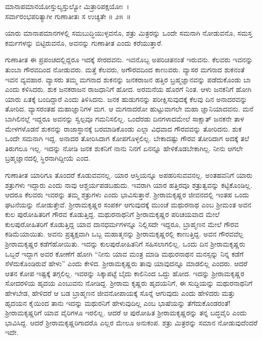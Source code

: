 \begin{shloka}
ಮಾನಾಪಮಾನಯೋಸ್ತುಲ್ಯಸ್ತುಲ್ಯೋ ಮಿತ್ರಾರಿಪಕ್ಷಯೋಃ~।\\ಸರ್ವಾರಂಭಪರಿತ್ಯಾಗೀ ಗುಣಾತೀತಃ ಸ ಉಚ್ಯತೇ \hfill॥ ೨೫~॥
\end{shloka}

\begin{artha}
ಯಾರು ಮಾನಾಪಮಾನಗಳಲ್ಲಿ ಸಮಬುದ್ಧಿಯುಳ್ಳವನೊ, ಶತ್ರು ಮಿತ್ರರನ್ನು ಒಂದೇ ಸಮನಾಗಿ ನೋಡುವನೊ, ಸಮಸ್ತ ಕರ್ಮಗಳನ್ನು ಬಿಟ್ಟಿರುವನೊ, ಅವನನ್ನು ಗುಣಾತೀತ ಎಂದು ಕರೆಯುತ್ತಾರೆ.
\end{artha}

ಗುಣಾತೀತ ಈ ಪ್ರಪಂಚದಲ್ಲಿದ್ದರೂ ಇದಕ್ಕೆ ಸೇರದವನು. ಇವನೊಬ್ಬ ಅಪರಿಚಿತನಂತೆ ಇರುವನು. ಕೆಲವರು ಇವನನ್ನು ತುಂಬಾ ಗೌರವದಿಂದ ನೋಡುವರು. ಮತ್ತೆ ಕೆಲವರು, ಅಗೌರವದಿಂದ ಕಾಣುವರು. ವ್ಯಾಸರ ಮಗನಾದ ಶುಕನಂತೆ ಇವನ ವ್ಯವಹಾರ. ವ್ಯಾಸರು ತಮ್ಮ ಮಗನಾದ ಶುಕನನ್ನು ಜನಕರಾಜನ ಹತ್ತಿರ ಬ್ರಹ್ಮಜ್ಞಾನವನ್ನು ಪಡೆದುಕೊಂಡು ಬಾ ಎಂದು ಕಳಿಸಿದರು. ಶುಕ ಜನಕರಾಜನ ರಾಜಧಾನಿಗೆ ಹೋದ. ಅರಮನೆಯ ಹೊರಗೆ ನಿಂತ. ಆಳು ಜನಕನಿಗೆ ಹೋಗಿ ಯಾರು ಏತಕ್ಕೆ ಬಂದಿದ್ದಾರೆ ಎಂದು ತಿಳಿಸಿದನು. ಜನಕ ಹುಡುಗನನ್ನು ಪರೀಕ್ಷಿಸುವುದಕ್ಕೆ ಕೆಲವು ದಿನ ಅನಾದರವನ್ನು ತೋರಿದ. ವ್ಯಾಸರಂತಹ ಮಹಾಜ್ಞಾನಿಗಳ ಮಗ. ಆ ಮಗನಾದರೋ ಹುಟ್ಟುವಾಗಲೇ ಮಹಾ ಜ್ಞಾನಿಯಾದವನು. ಮನೆ ಬಾಗಿಲಿನಲ್ಲೆ ಇದ್ದರೂ ಅವನನ್ನು ಸ್ವಲ್ಪವೂ ಗಮನಿಸಲಿಲ್ಲ. ಒಂದೆರಡು ದಿನಗಳಾದಮೇಲೆ ಸಾಕ್ಷಾತ್ ಜನಕನೇ ತಾಳ ಮೇಳಗಳೊಡನೆ ಶುಕನನ್ನು ರಾಜಾಸ್ಥಾನಕ್ಕೆ ಬರಮಾಡಿಕೊಂಡು ಎಲ್ಲಾ ವಿಧವಾದ ಗೌರವವನ್ನು ತೋರಿದನು. ಶುಕ ಒಂದೇ ಸಮನಾಗಿ ಇದ್ದ. ಅನಾದರ ತೋರಿಸಿದಾಗ ಕೋಪಗೊಳ್ಳಲಿಲ್ಲ. ಬೇಕಾದಷ್ಟು ಗೌರವ ತೋರಿದಾಗ ಅದಕ್ಕೆ ತಲೆ ತಿರುಗಲೂ ಇಲ್ಲ. ಇದನ್ನು ನೋಡಿ ಜನಕ ಶುಕನಿಗೆ ನಾನು ನಿನಗೆ ಏನನ್ನೂ ಹೇಳಿಕೊಡಬೇಕಾಗಿಲ್ಲ. ನೀನು ಆಗಲೇ ಬ್ರಹ್ಮಜ್ಞಾನದಲ್ಲಿ ಸ್ಥಿರನಾಗಿದ್ದೀಯೆ ಎಂದ.

ಗುಣಾತೀತ ಯಾರಿಗೂ ತೊಂದರೆ ಕೊಡುವವನಲ್ಲ. ಯಾರ ಆಸ್ತಿಯನ್ನೂ ಅಪಹರಿಸುವವನಲ್ಲ. ಅಂತಹವನಿಗೆ ಯಾರು ಶತ್ರುಗಳು ಇದ್ದಾರು ಎಂದು ನಾವು ಆಶ್ಚರ್ಯಪಡಬಹುದು. ಇವರಾಗಿ ಯಾರ ಹತ್ತಿರವೂ ಶತ್ರುತ್ವವನ್ನು ಕಟ್ಟಿಕೊಂಡಿಲ್ಲ. ಆದರೂ ಕೆಲವರು ಇವರನ್ನು ತಮ್ಮ ಶತ್ರುಗಳು ಎಂದು ಭಾವಿಸುತ್ತಾರೆ. ಶ‍್ರೀರಾಮಕೃಷ್ಣರ ಜೀವನದಲ್ಲಿ ಇಂತಹ ಒಂದು ಘಟನೆಯನ್ನು ನೋಡುತ್ತೇವೆ. ಶ‍್ರೀರಾಮಕೃಷ್ಣರ ಸಂಪರ್ಕ ಆಗುವುದಕ್ಕೆ ಮುಂಚೆ ಮಥುರನಾಥ ಎಂಬ ಶ‍್ರೀಮಂತ ಅವನ ಕುಲ ಪುರೋಹಿತರಿಗೆ ಗೌರವ ಕೊಡುತ್ತಿದ್ದ. ಮಥುರನಾಥನಿಗೆ ಶ‍್ರೀರಾಮಕೃಷ್ಣರ ಪರಿಚಯವಾದ ಮೇಲೆ ಕುಲಪುರೋಹಿತರಿಗೆ ಕೊಡುತ್ತಿದ್ದ ಯಾವ ದಾನಧರ್ಮಗಳನ್ನೂ ನಿಲ್ಲಿಸದೇ ಇದ್ದರೂ, ಬ್ರಾಹ್ಮಣನ ಮೇಲೆ ಗೌರವ ಕಡಿಮೆಯಾಯಿತು. ಅವನು ಪ್ರತ್ಯಕ್ಷವಾಗಿ ಒಬ್ಬ ಮಹಾತ್ಮನನ್ನು ಶ‍್ರೀರಾಮಕೃಷ್ಣರಲ್ಲಿ ಕಾಣುತ್ತಿದ್ದ. ಅವನ ಗೌರವವೆಲ್ಲ ಶ‍್ರೀರಾಮಕೃಷ್ಣರ ಕಡೆಗೆ\break ಹೋಯಿತು. ಇದನ್ನು ಕುಲಪುರೋಹಿತನಿಗೆ ಸಹಿಸಲಾಗಲಿಲ್ಲ. ಒಂದು ದಿನ ಶ‍್ರೀರಾಮಕೃಷ್ಣರು ಒಬ್ಬರೆ ಇದ್ದಾಗ ಅವರ ಕೋಣೆಗೆ ಹೋಗಿ “ನೀನು ಯಾವ ಮಂತ್ರ ಮಾಡಿ ಮಥುರನಾಥನ ಮನಸ್ಸನ್ನು ನಿನ್ನ ಕಡೆಗೆ ಸೆಳೆದುಕೊಂಡಿರುವೆ ಹೇಳು” ಎಂದು ಕೇಳಿದ. ಶ‍್ರೀರಾಮಕೃಷ್ಣರು ತಾವು ಯಾವುದನ್ನೂ ಮಾಡಲಿಲ್ಲ ಎಂದರು. ಆದರೆ ಆತನ ಕೋಪ ಇಷ್ಟಕ್ಕೆ ತಗ್ಗಲಿಲ್ಲ. ಇವರನ್ನು ಸಿಕ್ಕಾಪಟ್ಟೆ ಬೈದು ಕಾಲಿನಿಂದ ಒದ್ದು ಹೋದ. ಇದನ್ನು ಶ‍್ರೀರಾಮಕೃಷ್ಣರ ಸೋದರಳಿಯ ಹೃದಯ ಎಂಬುವನು ನೋಡಿದ್ದ. ಶ‍್ರೀರಾಮ ಕೃಷ್ಣರು ಹೃದಯನಿಗೆ, ಈ ಸುದ್ದಿಯನ್ನು ಮಥುರನಾಥನಿಗೆ ಹೇಳಬೇಡ, ಹೇಳಿದರೆ ಆ ಬಡ ಬ್ರಾಹ್ಮಣನ ಜೀವನೋಪಾಯಕ್ಕೆ ಸೊನ್ನೆ ಆಗುವುದು ಎಂದು ಹೇಳಿದರು ಮತ್ತು ಹೃದಯನ ಕೈಯಿಂದ ತಾನು ಇದನ್ನು ಮಥುರನಿಗೆ ಹೇಳುವುದಿಲ್ಲ ಎಂಬ ಭಾಷೆಯನ್ನು ತೆಗೆದುಕೊಂಡರಂತೆ! ಶ‍್ರೀರಾಮಕೃಷ್ಣರಿಗೆ ಯಾವ ವೈರಿಗಳೂ ಇರಲಿಲ್ಲ. ಆದರೆ ಆ ಪುರೋಹಿತ ಶ‍್ರೀರಾಮಕೃಷ್ಣರನ್ನು ತನ್ನ ಬದ್ಧವೈರಿ ಎಂದು ಭಾವಿಸಿದ್ದ. ಆದರೆ ಶ‍್ರೀರಾಮಕೃಷ್ಣರಿಗಾದರೊ ಎಲ್ಲರ ಮೇಲೂ ಅನುಕಂಪ. ಶತ್ರು ಮಿತ್ರರನ್ನು ಸಮಾನ ನೋಡುವುದೆಂದರೆ ಇದೇ.

